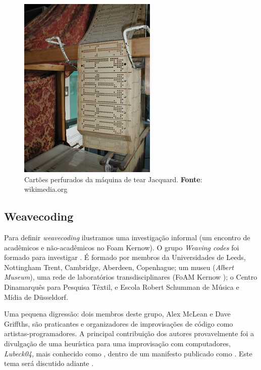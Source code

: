 \begin{figure}[!h]
  \centering
  \includegraphics[scale=0.82]{imagens/Jacquard.jpg}
  \caption{Cartões perfurados da máquina de tear Jacquard. \textbf{Fonte}: wikimedia.org }
  \label{fig:jacquard}
\end{figure} 

\newpage

\subsection{Weavecoding}

Para definir \emph{weavecoding} ilustramos uma investigação informal (um encontro de acadêmicos e não-acadêmicos no Foam Kernow). O grupo \emph{Weaving codes} foi formado para  investigar . É formado por membros da Universidades de Leeds, Nottingham Trent, Cambridge, Aberdeen, Copenhague; um museu (\emph{Albert Museum}), uma rede de laboratórios transdisciplinares (FoAM Kernow ); o Centro Dinamarquês para Pesquisa Têxtil, e Escola Robert Schumman de Música e Mídia de  Düsseldorf. 

Uma pequena digressão: dois membros deste grupo, Alex McLean e Dave Griffths, são praticantes e organizadores de improvisações de código como artistas-programadores. A principal contribuição dos autores provavelmente foi a divulgação de uma heurística para uma improvisação com computadores, \emph{Lubeck04}, mais conhecido como , dentro de um manifesto publicado como  \cite{ward_live_2004}. Este tema será discutido adiante .

